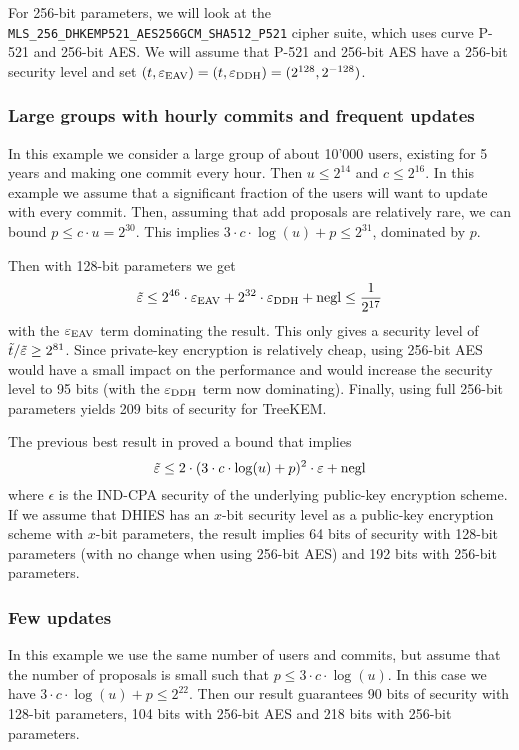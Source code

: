 For 256-bit parameters, we will look at the \texttt{MLS\_256\_DHKEMP521\_AES256GCM\_SHA512\_P521} cipher suite, which uses curve P-521 and 256-bit AES. We will assume that P-521 and 256-bit AES have a 256-bit security level and set $(t, \varepsilon_\mathrm{EAV}) = (t, \varepsilon_\mathrm{DDH}) = (2^{128}, 2^{-128})$.

\subsubsection{Large groups with hourly commits and frequent updates}

In this example we consider a large group of about 10'000 users, existing for 5 years and making one commit every hour. Then $u \le 2^{14}$ and $c \le 2^{16}$. In this example we assume that a significant fraction of the users will want to update with every commit. Then, assuming that add proposals are relatively rare, we can bound $p \le c \cdot u = 2^{30}$. This implies $3 \cdot c \cdot \log(u) + p \le 2^{31}$, dominated by $p$.

Then with 128-bit parameters we get
\[
	\tilde{\varepsilon} \le 2^{46} \cdot \varepsilon_\mathrm{EAV} + 2^{32} \cdot \varepsilon_\mathrm{DDH} + \mathrm{negl} \le \frac{1}{2^{17}}
\]
with the $\varepsilon_\mathrm{EAV}$ term dominating the result. This only gives a security level of $\tilde{t}/\tilde{\varepsilon} \ge 2^{81}$. Since private-key encryption is relatively cheap, using 256-bit AES would have a small impact on the performance and would increase the security level to 95 bits (with the $\varepsilon_\mathrm{DDH}$ term now dominating). Finally, using full 256-bit parameters yields 209 bits of security for TreeKEM.

The previous best result in \cite[Theorem 3]{ttkem} proved a bound that implies
\[
	\tilde{\varepsilon} \le 2 \cdot (3 \cdot c \cdot \log(u) + p)^2 \cdot \varepsilon + \mathrm{negl}
\]
where $\epsilon$ is the IND-CPA security of the underlying public-key encryption scheme. If we assume that DHIES has an $x$-bit security level as a public-key encryption scheme with $x$-bit parameters, the result implies 64 bits of security with 128-bit parameters (with no change when using 256-bit AES) and 192 bits with 256-bit parameters.

\subsubsection{Few updates}

In this example we use the same number of users and commits, but assume that the number of proposals is small such that $p \le 3 \cdot c \cdot \log(u)$. In this case we have $3 \cdot c \cdot \log(u) + p \le 2^{22}$. Then our result guarantees 90 bits of security with 128-bit parameters, 104 bits with 256-bit AES and 218 bits with 256-bit parameters.

